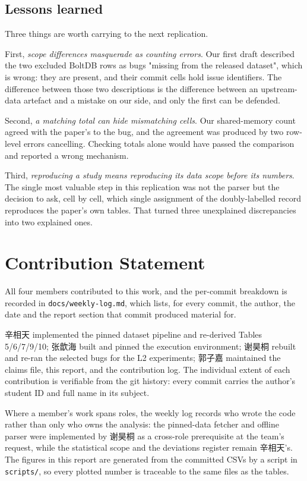 \documentclass[11pt]{article}
\begin{document}
\subsection{Lessons learned}

Three things are worth carrying to the next replication.

First, \emph{scope differences masquerade as counting errors}. Our first
draft described the two excluded BoltDB rows as bugs "missing from the
released dataset", which is wrong: they are present, and their commit cells
hold issue identifiers. The difference between those two descriptions is the
difference between an upstream-data artefact and a mistake on our side, and
only the first can be defended.

Second, \emph{a matching total can hide mismatching cells}. Our
shared-memory count agreed with the paper's to the bug, and the agreement was
produced by two row-level errors cancelling. Checking totals alone would
have passed the comparison and reported a wrong mechanism.

Third, \emph{reproducing a study means reproducing its data scope before its
numbers}. The single most valuable step in this replication was not the
parser but the decision to ask, cell by cell, which single assignment of the
doubly-labelled record reproduces the paper's own tables. That turned three
unexplained discrepancies into two explained ones.

\section*{Contribution Statement}

All four members contributed to this work, and the per-commit breakdown is
recorded in \texttt{docs/weekly-log.md}, which lists, for every commit, the
author, the date and the report section that commit produced material for.

辛相天 implemented the pinned dataset pipeline and re-derived Tables
5/6/7/9/10; 张歆海 built and pinned the execution environment; 谢昊桐
rebuilt and re-ran the selected bugs for the L2 experiments; 郭子嘉
maintained the claims file, this report, and the contribution log. The
individual extent of each contribution is verifiable from the git history:
every commit carries the author's student ID and full name in its subject.

Where a member's work spans roles, the weekly log records who wrote the
code rather than only who owns the analysis: the pinned-data fetcher and
offline parser were implemented by 谢昊桐 as a cross-role prerequisite at
the team's request, while the statistical scope and the deviations register
remain 辛相天's. The figures in this report are generated from the committed
CSVs by a script in \texttt{scripts/}, so every plotted number is traceable
to the same files as the tables.
\end{document}
